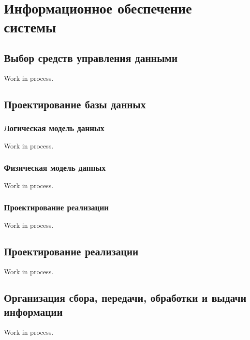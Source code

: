 \section{Информационное обеспечение системы}

\subsection{Выбор средств управления данными}

Work in process.

\subsection{Проектирование базы данных}

\subsubsection{Логическая модель данных}

Work in process.

\subsubsection{Физическая модель данных}

Work in process.

\subsubsection{Проектирование реализации}

Work in process.

\subsection{Проектирование реализации}

Work in process.

\subsection{Организация сбора, передачи, обработки и выдачи информации}

Work in process.

\clearpage
\newpage